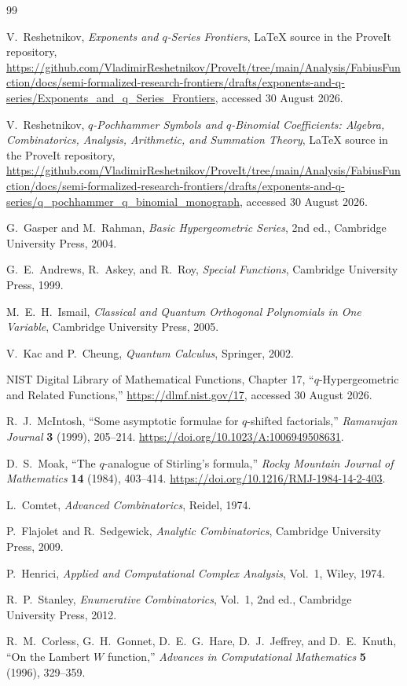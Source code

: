 \documentclass[11pt,oneside]{book}
\theoremstyle{definition}
\theoremstyle{remark}
\begin{document}
\begin{thebibliography}{99}

V.~Reshetnikov,
\emph{Exponents and $q$-Series Frontiers},
LaTeX source in the ProveIt repository,
\url{https://github.com/VladimirReshetnikov/ProveIt/tree/main/Analysis/FabiusFunction/docs/semi-formalized-research-frontiers/drafts/exponents-and-q-series/Exponents_and_q_Series_Frontiers},
accessed 30 August 2026.

V.~Reshetnikov,
\emph{$q$-Pochhammer Symbols and $q$-Binomial Coefficients: Algebra,
Combinatorics, Analysis, Arithmetic, and Summation Theory},
LaTeX source in the ProveIt repository,
\url{https://github.com/VladimirReshetnikov/ProveIt/tree/main/Analysis/FabiusFunction/docs/semi-formalized-research-frontiers/drafts/exponents-and-q-series/q_pochhammer_q_binomial_monograph},
accessed 30 August 2026.

G.~Gasper and M.~Rahman,
\emph{Basic Hypergeometric Series}, 2nd ed.,
Cambridge University Press, 2004.

G.~E.~Andrews, R.~Askey, and R.~Roy,
\emph{Special Functions},
Cambridge University Press, 1999.

M.~E.~H.~Ismail,
\emph{Classical and Quantum Orthogonal Polynomials in One Variable},
Cambridge University Press, 2005.

V.~Kac and P.~Cheung,
\emph{Quantum Calculus},
Springer, 2002.

NIST Digital Library of Mathematical Functions,
Chapter 17, ``$q$-Hypergeometric and Related Functions,''
\url{https://dlmf.nist.gov/17}, accessed 30 August 2026.

R.~J.~McIntosh,
``Some asymptotic formulae for $q$-shifted factorials,''
\emph{Ramanujan Journal} \textbf{3} (1999), 205--214.
\url{https://doi.org/10.1023/A:1006949508631}.

D.~S.~Moak,
``The $q$-analogue of Stirling's formula,''
\emph{Rocky Mountain Journal of Mathematics} \textbf{14} (1984), 403--414.
\url{https://doi.org/10.1216/RMJ-1984-14-2-403}.

L.~Comtet,
\emph{Advanced Combinatorics},
Reidel, 1974.

P.~Flajolet and R.~Sedgewick,
\emph{Analytic Combinatorics},
Cambridge University Press, 2009.

P.~Henrici,
\emph{Applied and Computational Complex Analysis}, Vol.~1,
Wiley, 1974.

R.~P.~Stanley,
\emph{Enumerative Combinatorics}, Vol.~1, 2nd ed.,
Cambridge University Press, 2012.

R.~M.~Corless, G.~H.~Gonnet, D.~E.~G.~Hare, D.~J.~Jeffrey, and D.~E.~Knuth,
``On the Lambert $W$ function,''
\emph{Advances in Computational Mathematics} \textbf{5} (1996), 329--359.

\end{thebibliography}
\end{document}
